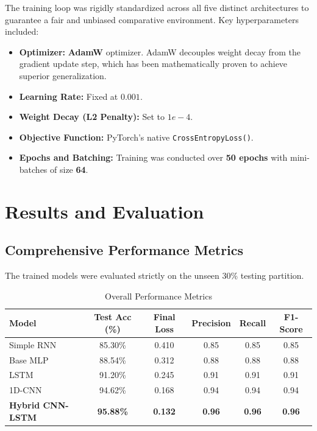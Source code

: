 \documentclass[12pt,a4paper]{article}
\begin{document}
The training loop was rigidly standardized across all five distinct architectures to guarantee a fair and unbiased comparative environment. Key hyperparameters included:
\begin{itemize}
    \item \textbf{Optimizer:} \textbf{AdamW} optimizer. AdamW decouples weight decay from the gradient update step, which has been mathematically proven to achieve superior generalization.
    \item \textbf{Learning Rate:} Fixed at $0.001$.
    \item \textbf{Weight Decay (L2 Penalty):} Set to $1e-4$.
    \item \textbf{Objective Function:} PyTorch's native \texttt{CrossEntropyLoss()}.
    \item \textbf{Epochs and Batching:} Training was conducted over \textbf{50 epochs} with mini-batches of size \textbf{64}.
\end{itemize}

\newpage
\section{Results and Evaluation}

\subsection{Comprehensive Performance Metrics}
The trained models were evaluated strictly on the unseen 30\% testing partition.

\begin{table}[H]
\centering
\caption{Overall Performance Metrics}
\begin{tabular}{lccccc}
\toprule
\textbf{Model} & \textbf{Test Acc (\%)} & \textbf{Final Loss} & \textbf{Precision} & \textbf{Recall} & \textbf{F1-Score} \\ \midrule
Simple RNN & 85.30\% & 0.410 & 0.85 & 0.85 & 0.85 \\
Base MLP & 88.54\% & 0.312 & 0.88 & 0.88 & 0.88 \\
LSTM & 91.20\% & 0.245 & 0.91 & 0.91 & 0.91 \\
1D-CNN & 94.62\% & 0.168 & 0.94 & 0.94 & 0.94 \\
\textbf{Hybrid CNN-LSTM} & \textbf{95.88\%} & \textbf{0.132} & \textbf{0.96} & \textbf{0.96} & \textbf{0.96} \\ \bottomrule
\end{tabular}
\end{table}
\end{document}
